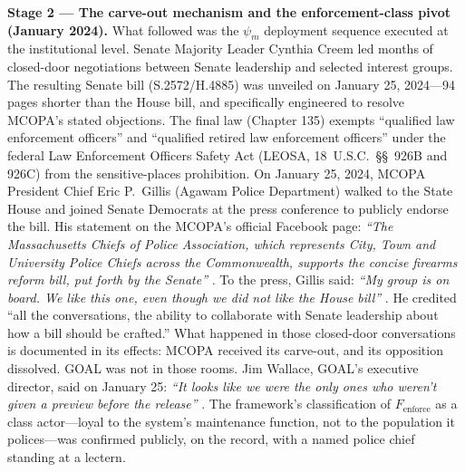 \begin{keyinsight}
\textbf{Stage 2 --- The carve-out mechanism and the enforcement-class pivot (January 2024).} What followed was the $\psi_m$ deployment sequence executed at the institutional level. Senate Majority Leader Cynthia Creem led months of closed-door negotiations between Senate leadership and selected interest groups. The resulting Senate bill (S.2572/H.4885) was unveiled on January 25, 2024---94 pages shorter than the House bill, and specifically engineered to resolve MCOPA's stated objections. The final law (Chapter 135) exempts ``qualified law enforcement officers'' and ``qualified retired law enforcement officers'' under the federal Law Enforcement Officers Safety Act (LEOSA, 18~U.S.C.~\S\S~926B and 926C) from the sensitive-places prohibition. On January 25, 2024, MCOPA President Chief Eric P.\ Gillis (Agawam Police Department) walked to the State House and joined Senate Democrats at the press conference to publicly endorse the bill. His statement on the MCOPA's official Facebook page: \textit{``The Massachusetts Chiefs of Police Association, which represents City, Town and University Police Chiefs across the Commonwealth, supports the concise firearms reform bill, put forth by the Senate''} \cite{mcopa_senate_support_fb_2024}. To the press, Gillis said: \textit{``My group is on board. We like this one, even though we did not like the House bill''} \cite{wbur_senate_gun_2024}. He credited ``all the conversations, the ability to collaborate with Senate leadership about how a bill should be crafted.'' What happened in those closed-door conversations is documented in its effects: MCOPA received its carve-out, and its opposition dissolved. GOAL was not in those rooms. Jim Wallace, GOAL's executive director, said on January 25: \textit{``It looks like we were the only ones who weren't given a preview before the release''} \cite{wbur_senate_gun_2024}. The framework's classification of $F_{\text{enforce}}$ as a class actor---loyal to the system's maintenance function, not to the population it polices---was confirmed publicly, on the record, with a named police chief standing at a lectern.


\end{keyinsight}
